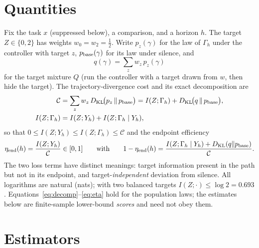 \documentclass[10pt]{article}
\newcommand{\KL}{D_{\mathrm{KL}}}
\newcommand{\Cost}{\mathcal{C}}
\begin{document}
\section{Quantities}
Fix the task $x$ (suppressed below), a comparison, and a horizon $h$. The target $Z\in\{0,2\}$ has weights $w_0=w_2=\tfrac12$. Write $p_z(\gamma)$ for the law of $\Gamma_h$ under the controller with target $z$, $p_{\rm base}(\gamma)$ for its law under silence, and
\begin{equation}
q(\gamma)=\sum_z w_z\,p_z(\gamma)
\end{equation}
for the target mixture $Q$ (run the controller with a target drawn from $w$, then hide the target). The trajectory-divergence cost and its exact decomposition are
\begin{align}
\Cost &= \sum_z w_z\,\KL\!\big(p_z\,\Vert\,p_{\rm base}\big)
 = I(Z;\Gamma_h) + \KL\!\big(q\,\Vert\,p_{\rm base}\big), \label{eq:decomp}\\
I(Z;\Gamma_h) &= I(Z;Y_h) + I(Z;\Gamma_h\mid Y_h), \label{eq:chain}
\end{align}
so that $0\le I(Z;Y_h)\le I(Z;\Gamma_h)\le\Cost$ and the endpoint efficiency
\begin{equation}
\eta_{\rm end}(h)=\frac{I(Z;Y_h)}{\Cost}\in[0,1]
\qquad\text{with}\qquad
1-\eta_{\rm end}(h)=\frac{I(Z;\Gamma_h\mid Y_h)+\KL(q\Vert p_{\rm base})}{\Cost}. \label{eq:eta}
\end{equation}
The two loss terms have distinct meanings: target information present in the path but not in its endpoint, and target-\emph{independent} deviation from silence. All logarithms are natural (nats); with two balanced targets $I(Z;\cdot)\le\log2=0.693$. Equations~\eqref{eq:decomp}--\eqref{eq:eta} hold for the population laws; the estimates below are finite-sample lower-bound \emph{scores} and need not obey them.

\section{Estimators}
\end{document}
